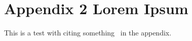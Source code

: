 

\chapter{Appendix 2 Lorem Ipsum}
\label{app:lorem_ipsum2}

This is a test with citing something~\cite{ecoop12-dias} in the appendix.

\lipsum[1-5]


